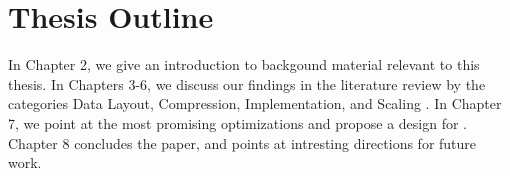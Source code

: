 \section{Thesis Outline}
\label{sec:Thesis Outline}
In Chapter 2, we give an introduction to backgound material relevant to this thesis. In Chapters 3-6, we discuss our findings in the literature review by the categories Data Layout, Compression, Implementation, and Scaling . In Chapter 7, we point at the most promising optimizations and propose a design for \genusSoftware. Chapter 8 concludes the paper, and points at intresting directions for future work.

